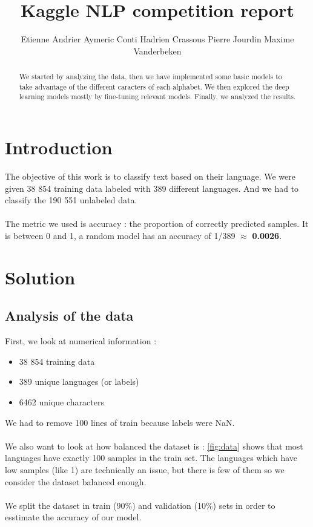 \documentclass[11pt]{article}
\title{Kaggle NLP competition report}
\author{Etienne Andrier \And Aymeric Conti \And Hadrien Crassous \AND Pierre Jourdin \And Maxime Vanderbeken}
\begin{document}
\maketitle
\begin{abstract}
We started by analyzing the data, then we have implemented some basic models to take advantage of the different caracters of each alphabet. We then explored the deep learning models mostly by fine-tuning relevant models. Finally, we analyzed the results.
\end{abstract}

\section{Introduction}

The objective of this work is to classify text based on their language. We were given 38 854 training data labeled with 389 different languages. And we had to classify the 190 551 unlabeled data.
\\
\\
The metric we used is accuracy : the proportion of correctly predicted samples. It is between 0 and 1, a random model has an accuracy of 1/389 $\approx$ \textbf{0.0026}.

\section{Solution}

\subsection{Analysis of the data}
First, we look at numerical information :
\begin{itemize}[noitemsep, topsep=0pt]
    \item 38 854 training data
    \item 389 unique languages (or labels)
    \item 6462 unique characters
\end{itemize}
We had to remove 100 lines of train because labels were NaN.
\\\\
We also want to look at how balanced the dataset is : \autoref{fig:data} shows that most languages have exactly 100 samples in the train set. The languages which have low samples (like 1) are technically an issue, but there is few of them so we consider the dataset balanced enough.
\\\\
We split the dataset in train (90\%) and validation (10\%) sets in order to esstimate the accuracy of our model.
\end{document}
